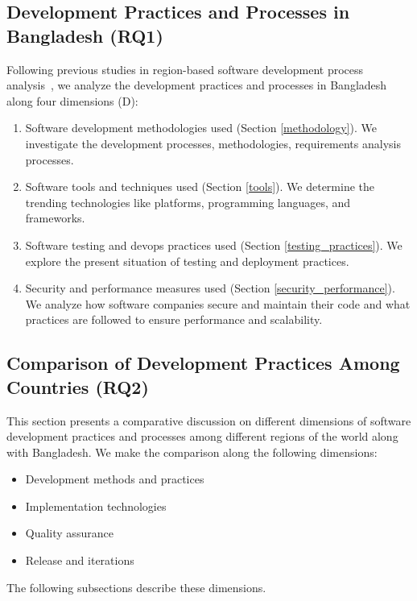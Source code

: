 \subsection{Development Practices and Processes in Bangladesh (RQ1)}
\label{RQ1}
Following previous studies in region-based software development process analysis~\cite{Garousi2013, Garousi2015, Vonken2012, Wang2018}, we 
analyze the development practices and processes in Bangladesh along four dimensions (D):
\begin{enumerate}[label=D\arabic{*}., leftmargin=20pt]
  \item Software development methodologies used (Section \ref{methodology}). We investigate the development
processes, methodologies, requirements analysis processes.
  \item Software tools and techniques used (Section \ref{tools}). We determine the
trending technologies like platforms, programming languages, and frameworks.
\item Software testing and devops practices used (Section \ref{testing_practices}). We explore the
present situation of testing and deployment practices.
\item Security and performance measures used (Section \ref{security_performance}). We analyze how
software companies secure and maintain their code and what practices are
followed to ensure performance and scalability.
\end{enumerate}






\subsection{Comparison of Development Practices Among Countries (RQ2)}
\label{RQ2}

This section presents a comparative discussion on different dimensions of software development practices and processes among different regions of the world along with Bangladesh. We make the comparison along the following dimensions:

\begin{itemize}
\item Development methods and practices
\item Implementation technologies
\item Quality assurance
\item Release and iterations
\end{itemize}

The following subsections describe these dimensions.




% 





% 
% 
